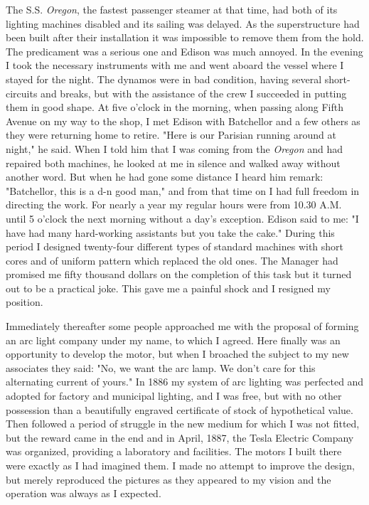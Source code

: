 \documentclass[a4paper,12pt,english,twoside,openright]{memoir}
\begin{document}
The S.S. \emph{Oregon}, the fastest passenger steamer at that time, had both of its lighting machines 
disabled and its sailing was delayed.  As the superstructure had been built after their installation it 
was impossible to remove them from the hold.  The predicament was a serious one and Edison 
was much annoyed.  In the evening I took the necessary instruments with me and went aboard 
the vessel where I stayed for the night.  The dynamos were in bad condition, having several 
short-circuits and breaks, but with the assistance of the crew I succeeded in putting them in good 
shape.  At five o'clock in the morning, when passing along Fifth Avenue on my way to the shop, I 
met Edison with Batchellor and a few others as they were returning home to retire.  "Here is our 
Parisian running around at night," he said.  When I told him that I was coming from the \emph{Oregon} 
and had repaired both machines, he looked at me in silence and walked away without another 
word.  But when he had gone some distance I heard him remark: "Batchellor, this is a d-n good 
man," and from that time on I had full freedom in directing the work.  For nearly a year my regular 
hours were from 10.30 A.M.  until 5 o'clock the next morning without a day's exception.  Edison 
said to me: "I have had many hard-working assistants but you take the cake." During this period I 
designed twenty-four different types of standard machines with short cores and of uniform pattern 
which replaced the old ones.  The Manager had promised me fifty thousand dollars on the completion of this  task but it turned out to be a practical joke.  This gave me a painful shock and I resigned my position.  


Immediately thereafter some people approached me with the proposal of forming an arc light 
company under my name, to which I agreed.  Here finally was an opportunity to develop the 
motor, but when I broached the subject to my new associates they said: "No, we want the arc 
lamp.  We don't care for this alternating current of yours." In 1886 my system of arc lighting was 
perfected and adopted for factory and municipal lighting, and I was free, but with no other 
possession than a beautifully engraved certificate of stock of hypothetical value.  Then followed a 
period of struggle in the new medium for which I was not fitted, but the reward came in the end 
and in April, 1887, the Tesla Electric Company was organized, providing a laboratory and 
facilities.  The motors I built there were exactly as I had imagined them.  I made no attempt to 
improve the design, but merely reproduced the pictures as they appeared to my vision and the 
operation was always as I expected.  
\end{document}
